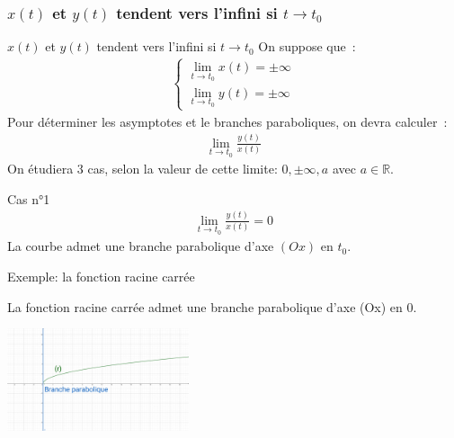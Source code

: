\documentclass[14pt]{beamer}
\begin{document}
\subsubsection{$x(t)$ et $y(t)$ tendent vers l'infini si $t \to t_0$}
\begin{frame}{$x(t)$ et $y(t)$ tendent vers l'infini si $t \to t_0$}
        On suppose que~:
        \begin{align*}
                \left\{\begin{array}{l}
                        \lim_{t\to t_0} x(t) = \pm\infty\\
                        \lim_{t\to t_0} y(t) = \pm\infty
                \end{array}\right.
        \end{align*}
        Pour déterminer les asymptotes et le branches paraboliques, on devra calculer~:
        \begin{align*}
                \lim_{t\to t_0}\frac{y(t)}{x(t)}
        \end{align*}
        On étudiera $3$ cas, selon la valeur de cette limite: $0, \pm\infty, a$ avec $a\in\mathbb{R}$.
\end{frame}

\begin{frame}{Cas n°1}
        \begin{align*}
                \lim_{t\to t_0}\frac{y(t)}{x(t)}=0
        \end{align*}
        La courbe admet une branche parabolique d'axe $(Ox)$ en $t_0$.
        \begin{exampleblock}{Exemple: la fonction racine carrée}
                \begin{minipage}[b]{5cm}
                La fonction racine carrée admet une branche parabolique d'axe (Ox) en $0$.
                \end{minipage}
                \includegraphics[height=3cm]{images/racine.png}
        \end{exampleblock}
\end{frame}
\end{document}
